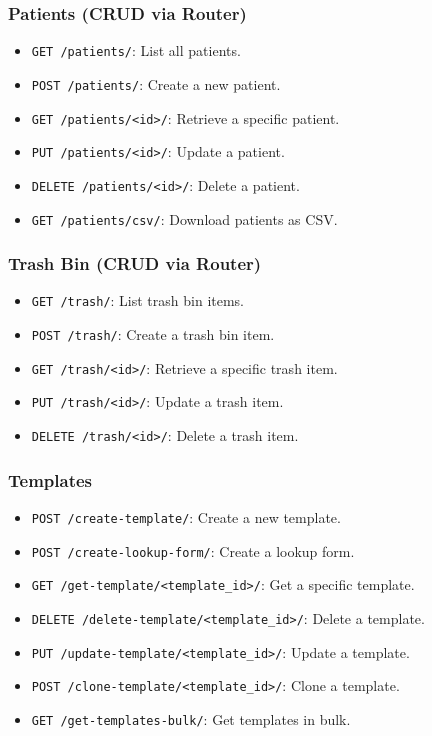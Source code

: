 \documentclass[11pt]{article}
\begin{document}
\subsubsection{Patients (CRUD via Router)}
\begin{itemize}[leftmargin=*]
  \item \verb|GET /patients/|: List all patients.
  \item \verb|POST /patients/|: Create a new patient.
  \item \verb|GET /patients/<id>/|: Retrieve a specific patient.
  \item \verb|PUT /patients/<id>/|: Update a patient.
  \item \verb|DELETE /patients/<id>/|: Delete a patient.
  \item \verb|GET /patients/csv/|: Download patients as CSV.
\end{itemize}

\subsubsection{Trash Bin (CRUD via Router)}
\begin{itemize}[leftmargin=*]
  \item \verb|GET /trash/|: List trash bin items.
  \item \verb|POST /trash/|: Create a trash bin item.
  \item \verb|GET /trash/<id>/|: Retrieve a specific trash item.
  \item \verb|PUT /trash/<id>/|: Update a trash item.
  \item \verb|DELETE /trash/<id>/|: Delete a trash item.
\end{itemize}

\subsubsection{Templates}
\begin{itemize}[leftmargin=*]
  \item \verb|POST /create-template/|: Create a new template.
  \item \verb|POST /create-lookup-form/|: Create a lookup form.
  \item \verb|GET /get-template/<template_id>/|: Get a specific template.
  \item \verb|DELETE /delete-template/<template_id>/|: Delete a template.
  \item \verb|PUT /update-template/<template_id>/|: Update a template.
  \item \verb|POST /clone-template/<template_id>/|: Clone a template.
  \item \verb|GET /get-templates-bulk/|: Get templates in bulk.
\end{itemize}
\end{document}
